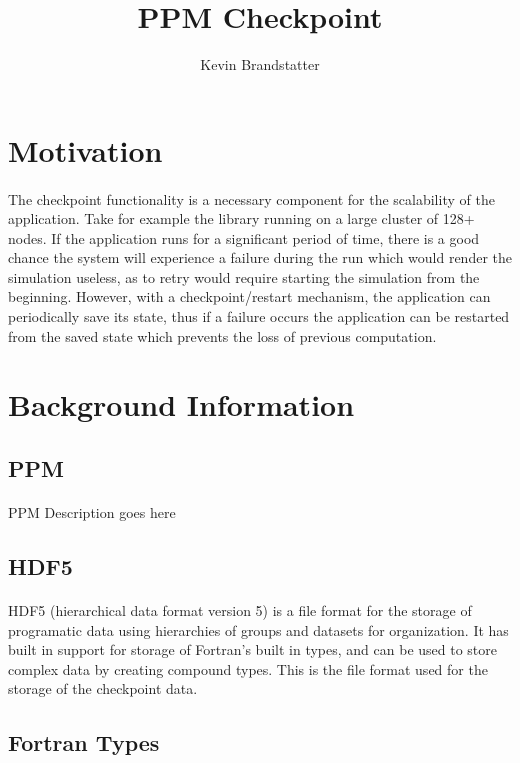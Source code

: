 \documentclass{article}
\title{PPM Checkpoint}
\author{Kevin Brandstatter}
\begin{document}
\maketitle
\section{Motivation}
\paragraph{}
The checkpoint functionality is a necessary component for the scalability of the application. Take for example the library running on a large cluster of 128+ nodes. If the application runs for a significant period of time, there is a good chance the system will experience a failure during the run which would render the simulation useless, as to retry would require starting the simulation from the beginning. However, with a checkpoint/restart mechanism, the application can periodically save its state, thus if a failure occurs the application can be restarted from the saved state which prevents the loss of previous computation.

\section{Background Information}
\subsection{PPM}
\paragraph{}
PPM Description goes here
\subsection{HDF5}
\paragraph{}
HDF5 (hierarchical data format version 5) is a file format for the storage of programatic data using hierarchies of groups and datasets for organization. It has built in support for storage of Fortran's built in types, and can be used to store complex data by creating compound types. This is the file format used for the storage of the checkpoint data.

\subsection{Fortran Types}
\end{document}
